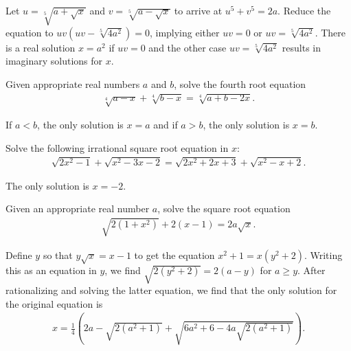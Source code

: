 \begin{solution}
    Let $u=\sqrt[5]{a+\sqrt{x}}$ and $v=\sqrt[5]{a-\sqrt{x}}$ to arrive at $u^5+v^5=2a$. Reduce the equation to $uv(uv-\sqrt[5]{4a^2})=0$, implying either $uv=0$ or $uv=\sqrt[5]{4a^2}$. There is a real solution $x=a^2$ if $uv=0$ and the other case $uv=\sqrt[5]{4a^2}$ results in imaginary solutions for $x$.
\end{solution}

\begin{question}\label{p:irrational-R}
    Given appropriate real numbers $a$ and $b$, solve the fourth root equation
    \begin{align*}
        \sqrt[4]{a-x}+\sqrt[4]{b-x}=\sqrt[4]{a+b-2x}.
    \end{align*}
\end{question}

\begin{solution}
    If $a<b$, the only solution is $x=a$ and if $a>b$, the only solution is $x=b$.
\end{solution}

\begin{question}\label{p:irrational-S}
    Solve the following irrational square root equation in $x$:
    \begin{align*}
        \sqrt{2x^2-1}+\sqrt{x^2-3x-2} = \sqrt{2x^2+2x+3}+\sqrt{x^2-x+2}.
    \end{align*}
\end{question}

\begin{solution}
    The only solution is $x=-2$.
\end{solution}


\begin{question}\label{p:irrational-T}
    Given an appropriate real number $a$, solve the square root equation
    \begin{align*}
        \sqrt{2(1+x^2)}+2(x-1)=2a\sqrt{x}.
    \end{align*}
\end{question}

\begin{solution}
    Define $y$ so that $y\sqrt x = x-1$ to get the equation $x^2+1=x(y^2+2)$. Writing this as an equation in $y$, we find $\sqrt{2(y^2+2)}=2(a-y)$ for $a\geq y$. After rationalizing and solving the latter equation, we find that the only solution for the original equation is
    \begin{align*}
        x = \frac{1}{4}\left(2a - \sqrt{2(a^2+1)} +\sqrt{6a^2+6-4a\sqrt{2(a^2+1)}}\right).
    \end{align*}
\end{solution}


